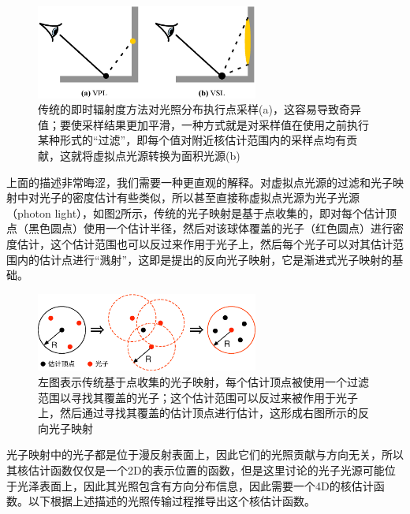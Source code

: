 \begin{figure}
	\sidecaption
	\includegraphics[width=0.65\textwidth]{figures/ir/vpl-vs-vsl}
	\caption{传统的即时辐射度方法对光照分布执行点采样(a)，这容易导致奇异值；要使采样结果更加平滑，一种方式就是对采样值在使用之前执行某种形式的“过滤”，即每个值对附近核估计范围内的采样点均有贡献，这就将虚拟点光源转换为面积光源(b)}
	\label{f:ir-vpl-vs-vsl}
\end{figure}

上面的描述非常晦涩，我们需要一种更直观的解释。对虚拟点光源的过滤和光子映射中对光子的密度估计有些类似，所以\cite{a:VirtualSphericalLightsforMany-LightRenderingofGlossyScenes}甚至直接称虚拟点光源为光子光源（photon light），如图\ref{f:ir-reverse-pm}所示，传统的光子映射是基于点收集的，即对每个估计顶点（黑色圆点）使用一个估计半径，然后对该球体覆盖的光子（红色圆点）进行密度估计，这个估计范围也可以反过来作用于光子上，然后每个光子可以对其估计范围内的估计点进行“溅射”，这即是\cite{a:FastFinalGatheringviaReversePhotonMapping}提出的反向光子映射，它是渐进式光子映射的基础。

\begin{figure}
	\sidecaption
	\includegraphics[width=0.65\textwidth]{figures/ir/reverse-pm}
	\caption{左图表示传统基于点收集的光子映射，每个估计顶点被使用一个过滤范围以寻找其覆盖的光子；这个估计范围可以反过来被作用于光子上，然后通过寻找其覆盖的估计顶点进行估计，这形成右图所示的反向光子映射}
	\label{f:ir-reverse-pm}
\end{figure}

光子映射中的光子都是位于漫反射表面上，因此它们的光照贡献与方向无关，所以其核估计函数仅仅是一个2D的表示位置的函数，但是这里讨论的光子光源可能位于光泽表面上，因此其光照包含有方向分布信息，因此需要一个4D的核估计函数。以下根据上述描述的光照传输过程推导出这个核估计函数。

